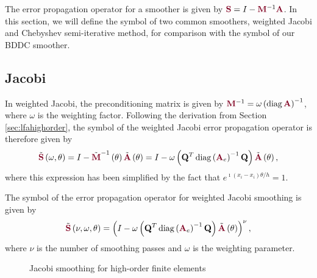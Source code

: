 The error propagation operator for a smoother is given by ${\color{burgundy}\mathbf{S}} = I - {\color{burgundy}\mathbf{M}}^{-1} {\color{burgundy}\mathbf{A}}$.
In this section, we will define the symbol of two common smoothers, weighted Jacobi and Chebyshev semi-iterative method, for comparison with the symbol of our BDDC smoother.

\subsection{Jacobi}

In weighted Jacobi, the preconditioning matrix is given by ${\color{burgundy}\mathbf{M}}^{-1} = \omega \left( \diag {\color{burgundy}\mathbf{A}} \right)^{-1}$, where $\omega$ is the weighting factor.
Following the derivation from Section \ref{sec:lfahighorder}, the symbol of the weighted Jacobi error propagation operator is therefore given by
\begin{equation}
\tilde{{\color{burgundy}\mathbf{S}}} \left( \omega, \theta \right) = I - \tilde{{\color{burgundy}\mathbf{M}}}^{-1} \left( \theta \right) \tilde{{\color{burgundy}\mathbf{A}}} \left( \theta \right) = I - \omega \left( \mathbf{Q}^T \diag \left( {\color{burgundy}\mathbf{A}}_e \right)^{-1} \mathbf{Q} \right) \tilde{{\color{burgundy}\mathbf{A}}} \left( \theta \right),
\end{equation}
where this expression has been simplified by the fact that $e^{\imath \left( x_i - x_i \right) \theta / h} = 1$.

\begin{definition}
The symbol of the error propagation operator for weighted Jacobi smoothing is given by
\begin{equation}
\tilde{{\color{burgundy}\mathbf{S}}} \left( \nu, \omega, \theta \right) = \left( I - \omega \left( \mathbf{Q}^T \diag \left( {\color{burgundy}\mathbf{A}}_e \right)^{-1} \mathbf{Q} \right) \tilde{{\color{burgundy}\mathbf{A}}} \left( \theta \right) \right)^\nu,
\end{equation}
where $\nu$ is the number of smoothing passes and $\omega$ is the weighting parameter.
\label{def:jacobi_symbol}
\end{definition}

\begin{figure}[!tbp]
  \centering
  \hfill
  \caption{Jacobi smoothing for high-order finite elements}
\end{figure}


